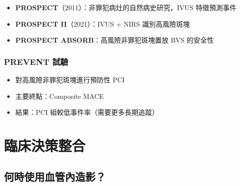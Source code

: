 \documentclass[12pt,a4paper]{article}
\begin{document}
\begin{itemize}
    \item \textbf{PROSPECT}（2011）：非罪犯病灶的自然病史研究，IVUS 特徵預測事件
    \item \textbf{PROSPECT II}（2021）：IVUS + NIRS 識別高風險斑塊
    \item \textbf{PROSPECT ABSORB}：高風險非罪犯斑塊置放 BVS 的安全性
\end{itemize}

\subsubsection{PREVENT 試驗}

\begin{itemize}
    \item 對高風險非罪犯斑塊進行預防性 PCI
    \item 主要終點：Composite MACE
    \item 結果：PCI 組較低事件率（需要更多長期追蹤）
\end{itemize}


\section{臨床決策整合}

\subsection{何時使用血管內造影？}
\end{document}
